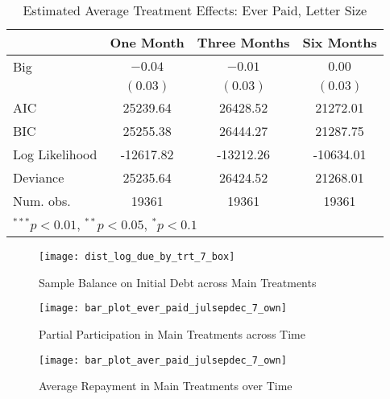 \documentclass[12pt,titlepage]{article}
\begin{document}
\begin{table}[htbp]
\caption{Estimated Average Treatment Effects: Ever Paid, Letter Size}
\begin{center}
\begin{tabular}{l c c c }
\hline
               & One Month & Three Months & Six Months \\
\hline
Big            & $-0.04$   & $-0.01$   & $0.00$    \\
               & $(0.03)$  & $(0.03)$  & $(0.03)$  \\
\hline
AIC            & 25239.64  & 26428.52  & 21272.01  \\
BIC            & 25255.38  & 26444.27  & 21287.75  \\
Log Likelihood & -12617.82 & -13212.26 & -10634.01 \\
Deviance       & 25235.64  & 26424.52  & 21268.01  \\
Num. obs.      & 19361     & 19361     & 19361     \\
\hline
\multicolumn{4}{l}{\scriptsize{$^{***}p<0.01$, $^{**}p<0.05$, $^*p<0.1$}}
\end{tabular}
\label{tbl:reg2_ep}
\end{center}
\end{table}

\begin{figure}[htpb]
\begin{center}
\caption{Sample Balance on Initial Debt across Main Treatments}
\label{fig:box_bal}
\bigskip
\texttt{[image: dist\_log\_due\_by\_trt\_7\_box]}
\end{center}
\end{figure}

\begin{figure}[htpb]
\begin{center}
\caption{Partial Participation in Main Treatments across Time}
\label{fig:ep_time_7_own}
\bigskip
\texttt{[image: bar\_plot\_ever\_paid\_julsepdec\_7\_own]}
\end{center}
\end{figure}

\begin{figure}[htpb]
\begin{center}
\caption{Average Repayment in Main Treatments over Time}
\label{fig:tp_time_7_own}
\bigskip
\texttt{[image: bar\_plot\_aver\_paid\_julsepdec\_7\_own]}
\end{center}
\end{figure}
\end{document}
